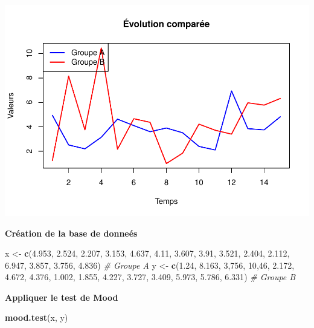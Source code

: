 \documentclass[
  12pt,
]{article}
\newenvironment{Shaded}{\begin{snugshade}}{\end{snugshade}}
\newcommand{\CommentTok}[1]{\textcolor[rgb]{0.56,0.35,0.01}{\textit{#1}}}
\newcommand{\DecValTok}[1]{\textcolor[rgb]{0.00,0.00,0.81}{#1}}
\newcommand{\FloatTok}[1]{\textcolor[rgb]{0.00,0.00,0.81}{#1}}
\newcommand{\FunctionTok}[1]{\textcolor[rgb]{0.13,0.29,0.53}{\textbf{#1}}}
\newcommand{\NormalTok}[1]{#1}
\newcommand{\OtherTok}[1]{\textcolor[rgb]{0.56,0.35,0.01}{#1}}
\begin{document}
\includegraphics{Stat_non_para_files/figure-latex/unnamed-chunk-104-1.pdf}

\textbf{Création de la base de donneés}

\begin{Shaded}
\begin{Highlighting}[]
\NormalTok{x }\OtherTok{\textless{}{-}} \FunctionTok{c}\NormalTok{(}\FloatTok{4.953}\NormalTok{, }\FloatTok{2.524}\NormalTok{, }\FloatTok{2.207}\NormalTok{, }\FloatTok{3.153}\NormalTok{, }\FloatTok{4.637}\NormalTok{, }\FloatTok{4.11}\NormalTok{, }\FloatTok{3.607}\NormalTok{, }\FloatTok{3.91}\NormalTok{, }\FloatTok{3.521}\NormalTok{,  }\FloatTok{2.404}\NormalTok{, }
       \FloatTok{2.112}\NormalTok{, }\FloatTok{6.947}\NormalTok{, }\FloatTok{3.857}\NormalTok{, }\FloatTok{3.756}\NormalTok{, }\FloatTok{4.836}\NormalTok{)  }\CommentTok{\# Groupe A}
\NormalTok{y }\OtherTok{\textless{}{-}} \FunctionTok{c}\NormalTok{(}\FloatTok{1.24}\NormalTok{, }\FloatTok{8.163}\NormalTok{, }\DecValTok{3}\NormalTok{,}\DecValTok{756}\NormalTok{, }\DecValTok{10}\NormalTok{,}\DecValTok{46}\NormalTok{, }\FloatTok{2.172}\NormalTok{, }\FloatTok{4.672}\NormalTok{, }\FloatTok{4.376}\NormalTok{, }\FloatTok{1.002}\NormalTok{, }\FloatTok{1.855}\NormalTok{, }\FloatTok{4.227}\NormalTok{, }
       \FloatTok{3.727}\NormalTok{, }\FloatTok{3.409}\NormalTok{, }\FloatTok{5.973}\NormalTok{, }\FloatTok{5.786}\NormalTok{, }\FloatTok{6.331}\NormalTok{) }\CommentTok{\# Groupe B}
\end{Highlighting}
\end{Shaded}

\textbf{Appliquer le test de Mood}

\begin{Shaded}
\begin{Highlighting}[]
\FunctionTok{mood.test}\NormalTok{(x, y)}
\end{Highlighting}
\end{Shaded}
\end{document}

